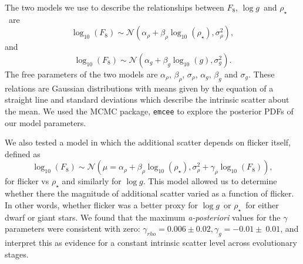 \documentclass[apjl]{emulateapj}
\newcommand{\logg}{$\log g$}
\newcommand{\rhostar}{$\rho_{\star}$}
\begin{document}

The two models we use to describe the relationships between $F_8$, \logg\ and
\rhostar\ are
\begin{equation}
	\log_{10}(F_8) \sim \mathcal{N} \left(\alpha_\rho +
    \beta_\rho \log_{10}(\rho_\star), \sigma_\rho^2 \right),
\end{equation}
\label{eq:rho}
and
\begin{equation}
	\log_{10}(F_8) \sim \mathcal{N} \left(\alpha_g + \beta_g
    \log_{10}(g), \sigma_g^2 \right).
\end{equation}
\label{eq:logg}
The free parameters of the two models are $\alpha_\rho$, $\beta_\rho$,
$\sigma_\rho$, $\alpha_g$, $\beta_g$ and $\sigma_g$.
These relations are Gaussian distributions with means given by the equation of
a straight line and standard deviations which describe the intrinsic scatter
about the mean.
We used the MCMC package, {\tt emcee} \citep{foreman-mackey:2013} to explore the
posterior PDFs of our model parameters.

We also tested a model in which the additional scatter depends on flicker
itself, defined as
\begin{equation}
	\log_{10}(F_8) \sim \mathcal{N} \left(\mu = \alpha_\rho +
    \beta_\rho \log_{10}(\rho_\star), \sigma_{\rho}^2 + \gamma_\rho
    \log_{10}(F_8)
    \right),
\end{equation}
\label{eq:rho2}
for flicker vs $\rho_\star$ and similarly for \logg.
This model allowed us to determine whether there the magnitude of additional
scatter varied as a function of flicker.
In other words, whether flicker was a better proxy for \logg\ or \rhostar\ for
either dwarf or giant stars.
We found that the maximum {\it a-posteriori} values for the $\gamma$
parameters were consistent with zero: $\gamma_{rho} = 0.006 \pm 0.02, \gamma_g
= -0.01 \pm\ 0.01$, and interpret this as evidence for a constant intrinsic
scatter level across evolutionary stages.
\end{document}
